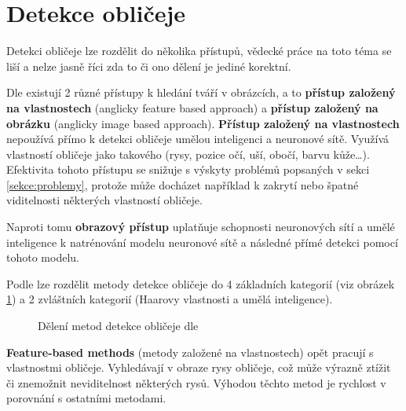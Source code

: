 \section{Detekce obličeje}
Detekci obličeje lze rozdělit do několika přístupů, vědecké práce na toto téma se liší a nelze jasně říci zda to či ono dělení je jediné korektní.

Dle \cite{fdReview} existují 2 různé přístupy k hledání tváří v obrázcích, a to \textbf{přístup založený na vlastnostech} (anglicky feature based approach) a \textbf{přístup založený na obrázku} (anglicky image based approach). 
\textbf{Přístup založený na vlastnostech} nepoužívá přímo k detekci obličeje umělou inteligenci a neuronové sítě. Využívá vlastností obličeje jako takového (rysy, pozice očí, uší, obočí, barvu kůže\dots). Efektivita tohoto přístupu se snižuje s výskyty problémů popsaných v sekci \ref{sekce:problemy}, protože může docházet například k zakrytí nebo špatné viditelnosti některých vlastností obličeje.

Naproti tomu \textbf{obrazový přístup} uplatňuje schopnosti neuronových sítí a umělé inteligence k natrénování modelu neuronové sítě a následné přímé detekci pomocí tohoto modelu. 

Podle \cite{feature-based-fd-review} lze rozdělit metody detekce obličeje do 4 základních kategorií (viz obrázek \ref{fddeleni}) a 2 zvláštních kategorií (Haarovy vlastnosti a umělá inteligence).
\begin{figure}[H]
  \begin{center}
  \label{fddeleni}
  \caption{Dělení metod detekce obličeje dle \cite{feature-based-fd-review}}
  \end{center}
\end{figure}

\textbf{Feature-based methods} (metody založené na vlastnostech) opět pracují s vlastnostmi obličeje. Vyhledávají v obraze rysy obličeje, což může výrazně ztížit či znemožnit neviditelnost některých rysů. Výhodou těchto metod je rychlost v porovnání s ostatními metodami.

